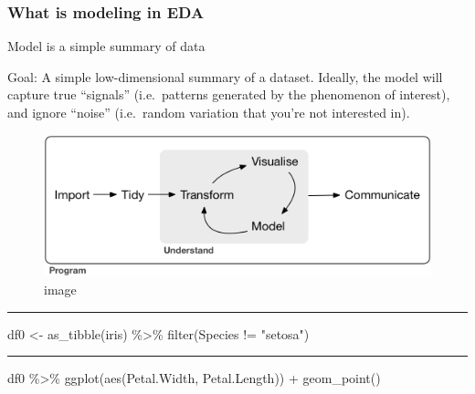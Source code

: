 \documentclass[
]{article}
\newenvironment{Shaded}{\begin{snugshade}}{\end{snugshade}}
\newcommand{\FunctionTok}[1]{\textcolor[rgb]{0.00,0.00,0.00}{#1}}
\newcommand{\NormalTok}[1]{#1}
\newcommand{\OtherTok}[1]{\textcolor[rgb]{0.56,0.35,0.01}{#1}}
\newcommand{\SpecialCharTok}[1]{\textcolor[rgb]{0.00,0.00,0.00}{#1}}
\newcommand{\StringTok}[1]{\textcolor[rgb]{0.31,0.60,0.02}{#1}}
\begin{document}
\hypertarget{what-is-modeling-in-eda}{%
\subsubsection{What is modeling in EDA}\label{what-is-modeling-in-eda}}

Model is a simple summary of data

Goal: A simple low-dimensional summary of a dataset. Ideally, the model
will capture true ``signals'' (i.e.~patterns generated by the phenomenon
of interest), and ignore ``noise'' (i.e.~random variation that you're
not interested in).

\begin{figure}
\centering
\includegraphics{data/data-science.png}
\caption{image}
\end{figure}

\begin{center}\rule{0.5\linewidth}{0.5pt}\end{center}

\begin{Shaded}
\begin{Highlighting}[]
\NormalTok{df0 }\OtherTok{\textless{}{-}} \FunctionTok{as\_tibble}\NormalTok{(iris) }\SpecialCharTok{\%\textgreater{}\%} \FunctionTok{filter}\NormalTok{(Species }\SpecialCharTok{!=} \StringTok{"setosa"}\NormalTok{)}
\end{Highlighting}
\end{Shaded}

\begin{center}\rule{0.5\linewidth}{0.5pt}\end{center}

\begin{Shaded}
\begin{Highlighting}[]
\NormalTok{df0 }\SpecialCharTok{\%\textgreater{}\%} \FunctionTok{ggplot}\NormalTok{(}\FunctionTok{aes}\NormalTok{(Petal.Width, Petal.Length)) }\SpecialCharTok{+} \FunctionTok{geom\_point}\NormalTok{()}
\end{Highlighting}
\end{Shaded}
\end{document}
